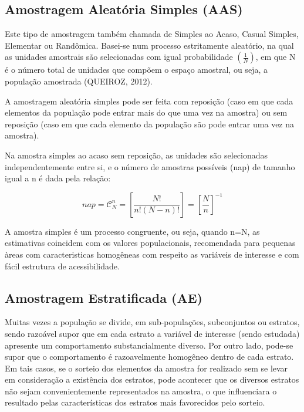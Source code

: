 \subsection{Amostragem Aleatória Simples (AAS)}

Este tipo de amostragem também chamada de Simples ao Acaso,
Casual Simples, Elementar ou Randômica. Basei-se num processo
estritamente aleatório, na qual as unidades amostrais são
selecionadas com igual probabilidade $(\frac{1}{N})$, em que N é o
número total de unidades que compõem o espaço amostral, ou seja, a
população amostrada (QUEIROZ, 2012).\vskip0.3cm


A amostragem aleatória simples pode ser feita com reposição (caso em
que cada elementos da população pode entrar mais do que uma vez na
amostra) ou sem reposição (caso em que cada elemento da população
são pode entrar uma vez na amostra).\vskip0.3cm



Na amostra simples ao acaso sem reposição, as unidades são selecionadas independentemente entre si, e o número de amostras possíveis (nap) de tamanho igual a n é dada pela relação:


\begin{equation}\label{nap}
    nap=  \mathcal{C}_{N}^{n}= \left[\frac{N!}{n!(N-n)!} \right] = \left[\frac{N}{n}\right]^{-1}
\end{equation}

A amostra simples é um processo congruente, ou seja, quando n=N, as estimativas coincidem com os valores populacionais, recomendada para pequenas àreas com caracteristicas homogêneas com respeito as variáveis de interesse e com fácil estrutura de acessibilidade.

\subsection{Amostragem Estratificada (AE)}

Muitas vezes a população se divide, em sub-populações,
subconjuntos ou estratos, sendo razoável supor que em cada estrato
a variável de interesse (sendo estudada) apresente um
comportamento substancialmente diverso. Por outro lado, pode-se
supor que o comportamento é razoavelmente homogêneo dentro de cada
estrato. Em tais casos, se o sorteio dos elementos da amostra for
realizado sem se levar em consideração a existência dos estratos,
pode acontecer que os diversos estratos não sejam convenientemente
representados na amostra, o que influenciara o resultado pelas
características dos estratos mais favorecidos pelo sorteio.\vskip0.3cm

